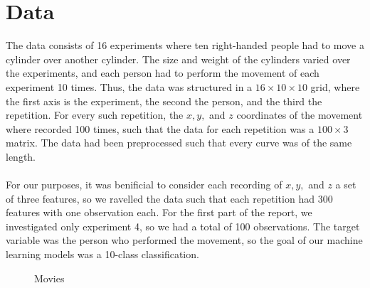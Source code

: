 \documentclass[12pt,fleqn]{article}
\begin{document}
\section{Data}
The data consists of 16 experiments where ten right-handed people had to move a cylinder over another cylinder.
The size and weight of the cylinders varied over the experiments, and each person had to perform the movement of each experiment 10 times.
Thus, the data was structured in a $ 16\times 10\times 10 $ grid, where the first axis is the experiment, the second the person, and the third the repetition.
For every such repetition, the $ x, y, $ and $ z $ coordinates of the movement where recorded 100 times, such that the data for each repetition was a $ 100\times 3 $ matrix.
The data had been preprocessed such that every curve was of the same length.\\
\\
For our purposes, it was benificial to consider each recording of $ x, y, $ and $ z $ a set of three features, so we ravelled the data such that each repetition had $ 300 $ features with one observation each.
For the first part of the report, we investigated only experiment 4, so we had a total of 100 observations.
The target variable was the person who performed the movement, so the goal of our machine learning models was a 10-class classification.
\begin{figure}[H]
		
	\centering
	\label{fig:trajects}
	\caption{Movies}
\end{figure}
\end{document}
